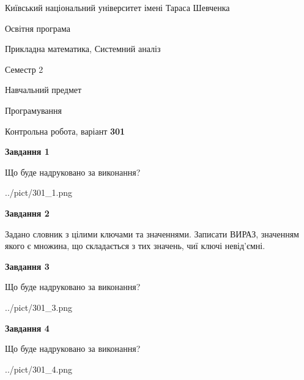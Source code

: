 \documentclass[12pt, ukrainian]{article}
\begin{document}
{{\begin {small}\par
{ \center  Київський національний університет імені Тараса Шевченка \par}
{\parbox {5 cm}{Освітня програма \hfill}{\parbox {8 cm}{Прикладна математика, Системний аналіз \hfill}}\parbox {5 cm}{\hfill Семестр 2}}\par
{\parbox {5 cm} {Навчальний предмет \hfill}\parbox {7 cm}{Програмування \hfill}\parbox {6cm}{\hfill}\par}\vspace{-7pt} \end{small}}{\center Контрольна робота, варіант  \No \textbf
{ 301 }\par}}
{
\begin {large}
{\begin {center}\textbf{Завдання 1}\end {center}}\par
Що буде надруковано за виконання?\par\par
\begin{center}
	{../pict/301_1.png}
\end{center}
\newpage

{\begin {center}\textbf{Завдання 2}\end {center}}\par
Задано словник  з цілими ключами та значеннями. Записати ВИРАЗ, значенням якого є множина, що складається  з тих значень, чиї ключі невід'єм\-ні.\par
\newpage

{\begin {center}\textbf{Завдання 3}\end {center}}\par
Що буде надруковано за виконання?\par
\begin{center}
	{../pict/301_3.png}
\end{center}
\newpage

{\begin {center}\textbf{Завдання 4}\end {center}}\par
Що буде надруковано за виконання?\par
\begin{center}
	{../pict/301_4.png}
\end{center}
\newpage


\end{large}}
\end{document}
